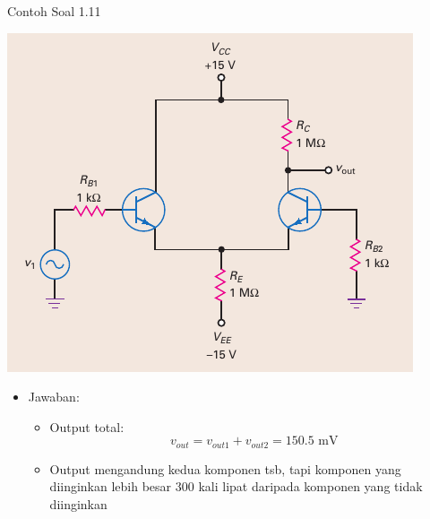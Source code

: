 \documentclass[aspectratio=169]{beamer}
\begin{document}
\begin{frame}{Contoh Soal 1.11}
	\begin{multicols}{2}
		\begin{center}
			\includegraphics[height=0.7\textheight]{gambar/01.fig22}
		\end{center}
		\columnbreak
		\begin{itemize}
			\item Jawaban:
			\begin{itemize}
				\item Output total:
				\[ v_{out} = v_{out1} + v_{out2} = 150.5 \text{ mV} \]
				\item Output mengandung kedua komponen tsb, tapi komponen yang diinginkan lebih besar 300 kali lipat daripada komponen yang tidak diinginkan
			\end{itemize}
		\end{itemize}
	\end{multicols}
\end{frame}
\end{document}
